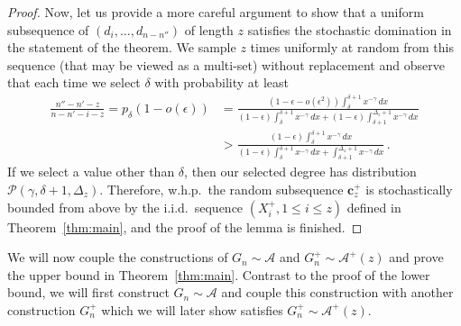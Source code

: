 \documentclass[12pt]{article}
\theoremstyle{definition}
\theoremstyle{remark}
\theoremstyle{remark}
\numberwithin{theorem}{section}
\newcommand{\abcdDist}{\ensuremath{\mathcal{A}}}
\newcommand{\abcdUpper}{\ensuremath{\mathcal{A}^+(z)}}
\newcommand{\tpl}[3]{\ensuremath{\mathcal{P}\left(#1,#2,#3\right)}}
\begin{document}
\begin{proof}
Now, let us provide a more careful argument to show that a uniform subsequence of $(d_i,\dots,d_{n-n''})$ of length $z$ satisfies the stochastic domination in the statement of the theorem. We sample $z$ times uniformly at random from this sequence (that may be viewed as a multi-set) without replacement and observe that each time we select $\delta$ with probability at least
\begin{align*}
\frac {n''-n'-z}{n-n'-i-z} = p_\delta (1-o(\epsilon)) 
&= \frac{(1-\epsilon-o(\epsilon^2))\int_\delta^{\delta+1} x^{-\gamma} \, dx}{(1-\epsilon)\int_\delta^{\delta+1} x^{-\gamma} \, dx + (1-\epsilon) \int_{\delta+1}^{\Delta_z+1} x^{-\gamma} \, dx} \\
&> \frac{(1-\epsilon)\int_\delta^{\delta+1} x^{-\gamma} \, dx}{(1-\epsilon)\int_\delta^{\delta+1} x^{-\gamma} \, dx + \int_{\delta+1}^{\Delta_z+1} x^{-\gamma} \, dx} \,.
\end{align*}
If we select a value other than $\delta$, then our selected degree has distribution $\tpl{\gamma}{\delta+1}{\Delta_z}$. Therefore, w.h.p.\ the random subsequence $\mathbf{c}_z^+$ is stochastically bounded from above by the i.i.d.\ sequence $(X_i^+, 1 \leq i \leq z)$ defined in Theorem~\ref{thm:main}, and the proof of the lemma is finished.
\end{proof}

We will now couple the constructions of $G_n \sim \abcdDist$ and $G_n^+ \sim \abcdUpper$ and prove the upper bound in Theorem~\ref{thm:main}. Contrast to the proof of the lower bound, we will first construct $G_n \sim \abcdDist$ and couple this construction with another construction $G_n^+$ which we will later show satisfies $G_n^+ \sim \abcdUpper$. 
\end{document}
